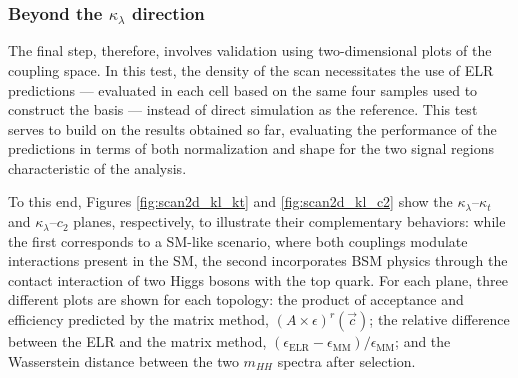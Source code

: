 \subsubsection{Beyond the $\kappa_\lambda$ direction}
%
The final step, therefore, involves validation using two-dimensional plots of the coupling space. In this test, the density of the scan necessitates the use of ELR predictions — evaluated in each cell based on the same four samples used to construct the basis — instead of direct simulation as the reference. This test serves to build on the results obtained so far, evaluating the performance of the predictions in terms of both normalization and shape for the two signal regions characteristic of the analysis.

To this end, Figures \ref{fig:scan2d_kl_kt} and \ref{fig:scan2d_kl_c2} show the $\kappa_\lambda$–$\kappa_t$ and $\kappa_\lambda$–$c_2$ planes, respectively, to illustrate their complementary behaviors: while the first corresponds to a SM-like scenario, where both couplings modulate interactions present in the SM, the second incorporates BSM physics through the contact interaction of two Higgs bosons with the top quark. For each plane, three different plots are shown for each topology: the product of acceptance and efficiency predicted by the matrix method, $(A\times\epsilon)^{r}(\vec{c})$; the relative difference between the ELR and the matrix method, $(\epsilon_\text{ELR}-\epsilon_\text{MM})/\epsilon_\text{MM}$; and the Wasserstein distance between the two $m_{HH}$ spectra after selection.

